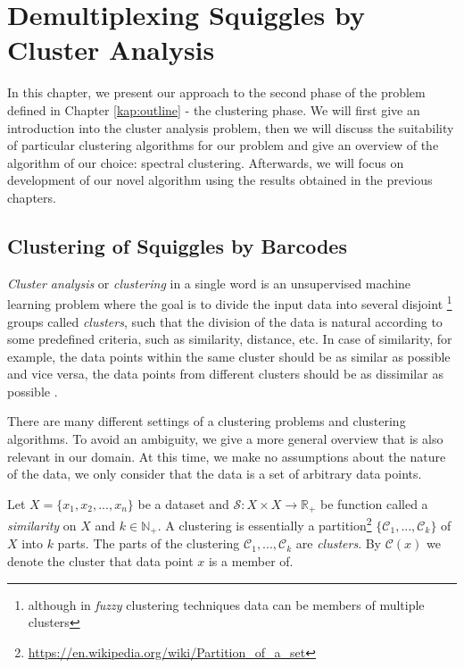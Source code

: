 \chapter{Demultiplexing Squiggles by Cluster Analysis}

\label{kap:clustering} %

In this chapter, we present our approach to the second phase of the problem defined in Chapter \ref{kap:outline} - the clustering phase. We will first give an introduction into the cluster analysis problem, then we will discuss the suitability of particular clustering algorithms for our problem and give an overview of the algorithm of our choice: spectral clustering. Afterwards, we will focus on development of our novel algorithm using the results obtained in the previous chapters.

\section{Clustering of Squiggles by Barcodes}
\textit{Cluster analysis} or \textit{clustering} in a single word is an unsupervised machine learning problem where the goal is to divide the input data into several disjoint \footnote{although in \textit{fuzzy} clustering techniques data can be members of multiple clusters} groups called \textit{clusters}, such that the division of the data is natural according to some predefined criteria, such as similarity, distance, etc. In case of similarity, for example, the data points within the same cluster should be as similar as possible and vice versa, the data points from different clusters should be as dissimilar as possible \cite{harmanVSA}.  


There are many different settings of a clustering problems and clustering algorithms. To avoid an ambiguity, we give a more general overview that is also relevant in our domain. At this time, we make no assumptions about the nature of the data, we only consider that the data is a set of arbitrary data points.

Let $X = \{x_1, x_2, ..., x_n\}$ be a dataset and $\mathcal{S}: X \times X \to \mathbb{R}_+$ be function called a \textit{similarity} on $X$ and $k \in \mathbb{N}_+$. A clustering is essentially a partition\footnote{\url{https://en.wikipedia.org/wiki/Partition_of_a_set}} $\{ \mathcal{C}_1, ..., \mathcal{C}_k \}$ of $X$ into $k$ parts. The parts of the clustering $\mathcal{C}_1, ..., \mathcal{C}_k$ are \textit{clusters}. By $\mathcal{C}(x)$ we denote the cluster that data point $x$ is a member of.

